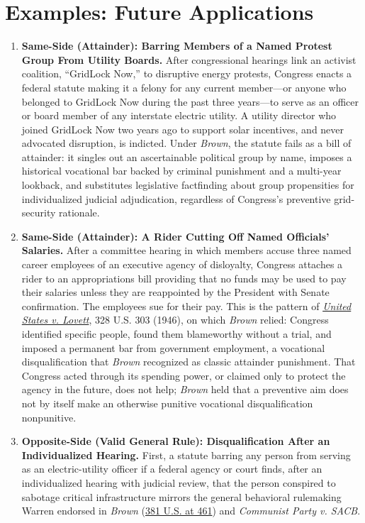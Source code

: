 \documentclass[12pt]{article}
\begin{document}
\section{Examples: Future Applications}
\begin{enumerate}

\item \textbf{Same-Side (Attainder): Barring Members of a Named Protest Group From Utility Boards.} After congressional hearings link an activist coalition, ``GridLock Now,'' to disruptive energy protests, Congress enacts a federal statute making it a felony for any current member---or anyone who belonged to GridLock Now during the past three years---to serve as an officer or board member of any interstate electric utility. A utility director who joined GridLock Now two years ago to support solar incentives, and never advocated disruption, is indicted. Under \textit{Brown}, the statute fails as a bill of attainder: it singles out an ascertainable political group by name, imposes a historical vocational bar backed by criminal punishment and a multi-year lookback, and substitutes legislative factfinding about group propensities for individualized judicial adjudication, regardless of Congress's preventive grid-security rationale.

\item \textbf{Same-Side (Attainder): A Rider Cutting Off Named Officials' Salaries.} After a committee hearing in which members accuse three named career employees of an executive agency of disloyalty, Congress attaches a rider to an appropriations bill providing that no funds may be used to pay their salaries unless they are reappointed by the President with Senate confirmation. The employees sue for their pay. This is the pattern of \href{https://supreme.justia.com/cases/federal/us/328/303/}{\textit{United States v. Lovett}}, 328 U.S. 303 (1946), on which \textit{Brown} relied: Congress identified specific people, found them blameworthy without a trial, and imposed a permanent bar from government employment, a vocational disqualification that \textit{Brown} recognized as classic attainder punishment. That Congress acted through its spending power, or claimed only to protect the agency in the future, does not help; \textit{Brown} held that a preventive aim does not by itself make an otherwise punitive vocational disqualification nonpunitive.

\item \textbf{Opposite-Side (Valid General Rule): Disqualification After an Individualized Hearing.} First, a statute barring any person from serving as an electric-utility officer if a federal agency or court finds, after an individualized hearing with judicial review, that the person conspired to sabotage critical infrastructure mirrors the general behavioral rulemaking Warren endorsed in \textit{Brown} (\href{https://supreme.justia.com/cases/federal/us/381/437/}{381 U.S. at 461}) and \textit{Communist Party v. SACB}.


\end{enumerate}
\end{document}
